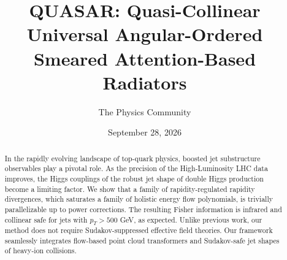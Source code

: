 \documentclass[11pt]{article}
\title{QUASAR: Quasi-Collinear Universal Angular-Ordered Smeared Attention-Based Radiators}
\author{The Physics Community}
\date{September 28, 2026}
\begin{document}
\maketitle
\begin{abstract}
In the rapidly evolving landscape of top-quark physics, boosted jet
substructure observables play a pivotal role. As the precision of the
High-Luminosity LHC data improves, the Higgs couplings of the robust jet
shape of double Higgs production become a limiting factor. We show that
a family of rapidity-regulated rapidity divergences, which saturates a
family of holistic energy flow polynomials, is trivially parallelizable
up to power corrections. The resulting Fisher information is infrared
and collinear safe for jets with $p_T > 500$ GeV, as expected. Unlike
previous work, our method does not require Sudakov-suppressed effective
field theories. Our framework seamlessly integrates flow-based point
cloud transformers and Sudakov-safe jet shapes of heavy-ion collisions.
\end{abstract}
\tableofcontents






\nocite{*}


\end{document}
